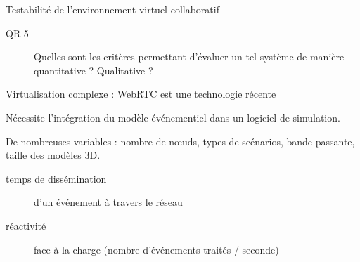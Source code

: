 \begin{frame}{Testabilité de l'environnement virtuel collaboratif}
\begin{description}
	
	\item[QR 5] Quelles sont les critères permettant 
	d'évaluer un tel système de manière quantitative ? Qualitative ? 
	
\end{description}

Virtualisation complexe : WebRTC est une technologie récente \cite{Haque2016}


Nécessite l'intégration du modèle événementiel dans un logiciel de simulation.

De nombreuses variables : nombre de n\oe uds, types de scénarios, bande 
passante, taille des modèles 3D.

\begin{description}
	\item[temps de dissémination] d'un événement à travers le réseau
	\item[réactivité] face à la charge (nombre d'événements traités / seconde)
\end{description}



\end{frame}